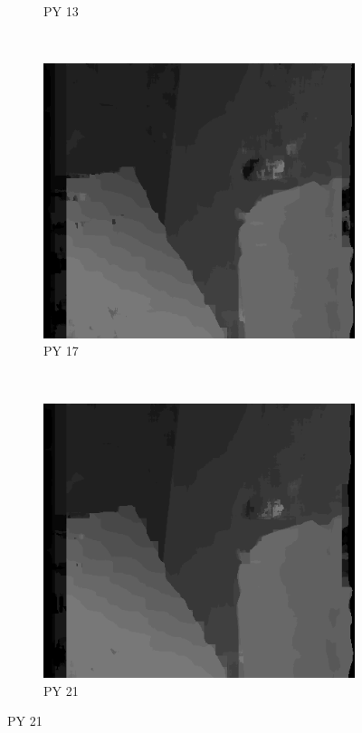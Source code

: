 \begin{figure}
\begin{subfigure}[b]{0.23\textwidth}
    \caption{PY 13}
  \end{subfigure}
  ~
  \begin{subfigure}[b]{0.23\textwidth}
    \centering
    \includegraphics[width=\textwidth]{images/stereo-pairs/venus_pyramid_17.png}
    \caption{PY 17}
  \end{subfigure}
  ~
  \begin{subfigure}[b]{0.23\textwidth}
    \centering
    \includegraphics[width=\textwidth]{images/stereo-pairs/venus_pyramid_21.png}
    \caption{PY 21}
  \end{subfigure}


\end{figure}
